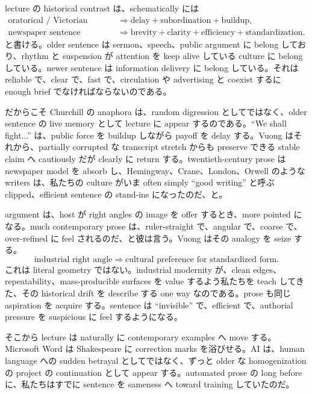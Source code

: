 lecture の historical contrast は、schematically には
\begin{align}
\text{oratorical / Victorian sentence} &\Longrightarrow \text{delay} + \text{subordination} + \text{buildup},\\
\text{newspaper sentence} &\Longrightarrow \text{brevity} + \text{clarity} + \text{efficiency} + \text{standardization}.
\end{align}
と書ける。older sentence は sermon、speech、public argument に belong しており、rhythm と suspension が attention を keep alive している culture に belong している。newer sentence は information delivery に belong している。それは reliable で、clear で、fast で、circulation や advertising と coexist するに enough brief でなければならないのである。

だからこそ Churchill の anaphora は、random digression としてではなく、older sentence の live memory として lecture に appear するのである。``We shall fight...'' は、public force を buildup しながら payoff を delay する。Vuong はそれから、partially corrupted な transcript stretch からも preserve できる stable claim へ cautiously だが clearly に return する。twentieth-century prose は newspaper model を absorb し、Hemingway、Crane、London、Orwell のような writers は、私たちの culture がいま often simply ``good writing'' と呼ぶ clipped、efficient sentence の stand-ins になったのだ、と。

argument は、host が right angles の image を offer するとき、more pointed になる。much contemporary prose は、ruler-straight で、angular で、coarse で、over-refined に feel されるのだ、と彼は言う。Vuong はその analogy を seize する。
\begin{equation}
\text{industrial right angle} \Longrightarrow \text{cultural preference for standardized form}.
\end{equation}
これは literal geometry ではない。industrial modernity が、clean edges、repeatability、mass-producible surfaces を value するよう私たちを teach してきた、その historical drift を describe する one way なのである。prose も同じ aspiration を acquire する。sentence は ``invisible'' で、efficient で、authorial pressure を suspicious に feel するようになる。

そこから lecture は naturally に contemporary examples へ move する。Microsoft Word は Shakespeare に correction marks を浴びせる。AI は、human language への sudden betrayal としてではなく、ずっと older な homogenization の project の continuation として appear する。automated prose の long before に、私たちはすでに sentence を sameness へ toward training していたのだ。

